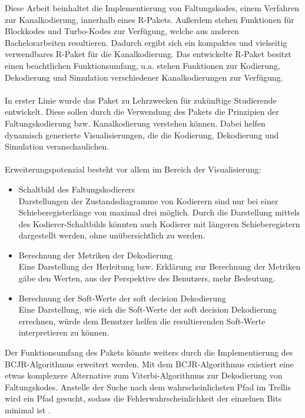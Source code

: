Diese Arbeit beinhaltet die Implementierung von Faltungskodes, einem Verfahren zur Kanalkodierung, innerhalb eines R-Pakets. Außerdem stehen Funktionen für Blockkodes und Turbo-Kodes zur Verfügung, welche aus anderen Bachelorarbeiten resultieren. Dadurch ergibt sich ein kompaktes und vielseitig verwendbares R-Paket für die Kanalkodierung. Das entwickelte R-Paket besitzt einen beachtlichen Funktionsumfang, u.a. stehen Funktionen zur Kodierung, Dekodierung und Simulation verschiedener Kanalkodierungen zur Verfügung.
\\
\\
In erster Linie wurde das Paket zu Lehrzwecken für zukünftige Studierende entwickelt. Diese sollen durch die Verwendung des Pakets die Prinzipien der Faltungskodierung bzw. Kanalkodierung verstehen können. Dabei helfen dynamisch generierte Visualisierungen, die die Kodierung, Dekodierung und Simulation veranschaulichen.
\\
\\
Erweiterungspotenzial besteht vor allem im Bereich der Visualisierung:
\begin{itemize}
\item Schaltbild des Faltungskodierers\\Darstellungen der Zustandsdiagramme von Kodierern sind nur bei einer Schieberegisterlänge von maximal drei möglich. Durch die Darstellung mittels des Kodierer-Schaltbilds könnten auch Kodierer mit längeren Schieberegistern dargestellt werden, ohne unübersichtlich zu werden.
\item Berechnung der Metriken der Dekodierung\\Eine Darstellung der Herleitung bzw. Erklärung zur Berechnung der Metriken gäbe den Werten, aus der Perspektive des Benutzers, mehr Bedeutung.
\item Berechnung der Soft-Werte der soft decision Dekodierung\\Eine Darstellung, wie sich die Soft-Werte der soft decision Dekodierung errechnen, würde dem Benutzer helfen die resultierenden Soft-Werte interpretieren zu können.
\end{itemize}
Der Funktionsumfang des Pakets könnte weiters durch die Implementierung des BCJR-Algorithmus erweitert werden. Mit dem BCJR-Algorithmus existiert eine etwas komplexere Alternative zum Viterbi-Algorithmus zur Dekodierung von Faltungskodes. Anstelle der Suche nach dem wahrscheinlichsten Pfad im Trellis wird ein Pfad gesucht, sodass die Fehlerwahrscheinlichkeit der einzelnen Bits minimal ist \cite[S. 233 ff.]{schonfeld2012informations}.